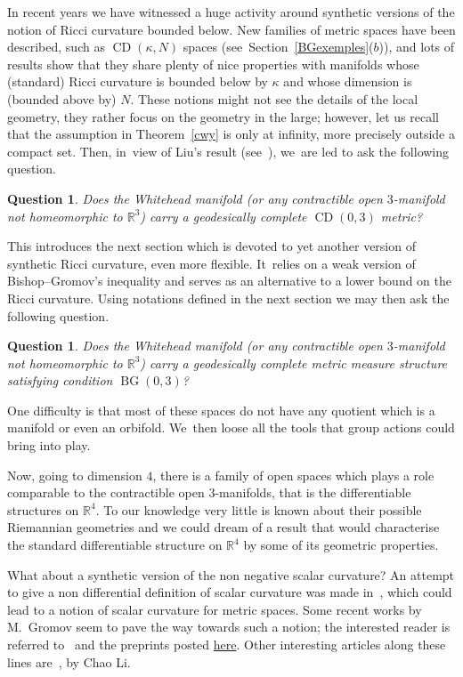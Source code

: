 \documentclass[pdftex]{sigma}
\numberwithin{equation}{section}
\newtheorem{question}[theor]{Question}
\newcommand{\CDCD}{\operatorname{CD}}
\newcommand{\BG}{\operatorname{BG}}
\begin{document}
In recent years we have witnessed a huge activity around synthetic versions of the notion of Ricci curvature bounded below. New families of metric
spaces have been described, such as $\CDCD (\kappa, N)$ spaces (see~Section~\ref{BGexemples}($b$)), and lots of results show that they share plenty of
nice properties with manifolds whose (standard) Ricci curvature is bounded below by $\kappa$ and whose dimension is (bounded above by) $N$. These notions might not see the details of the local geometry, they rather focus on the geometry in the large; however, let us recall that the assumption in Theorem~\ref{cwy} is only at infinity, more precisely outside a compact set. Then, in~view of Liu's result (see~\cite{Liu}), we~are led to ask the following question.

\begin{question}
Does the Whitehead manifold (or any contractible open $3$-manifold not homeo\-morphic to $\mathbb R^3$) carry a geodesically complete $\CDCD (0, 3)$ metric?
\end{question}

This introduces the next section which is devoted to yet another version of synthetic Ricci curvature, even more flexible. It~relies on a weak version of Bishop--Gromov's inequality and serves as an alternative to a lower bound on the Ricci curvature. Using notations defined in the next section we may then ask the following question.

\begin{question}
Does the Whitehead manifold (or any contractible open $3$-manifold not homeo\-morphic to $\mathbb R^3$) carry a geodesically complete metric measure
structure satisfying condition $\BG (0, 3)$?
\end{question}

One difficulty is that most of these spaces do not have any quotient which is a manifold or even an orbifold. We~then loose all the tools that group actions could bring into play.

Now, going to dimension $4$, there is a family of open spaces which plays
a role comparable to the contractible open $3$-manifolds, that is the differentiable structures on $\mathbb R^4$. To our knowledge very little is known about their possible Riemannian geometries and we could dream of a result that would characterise the standard differentiable structure on $\mathbb R^4$ by some of its geometric properties.

What about a synthetic version of the non negative scalar curvature? An attempt to give a non differential definition of scalar curvature was made in~\cite{Vero}, which could lead to a notion of scalar curvature for metric spaces. Some recent works by M.~Gromov seem to pave the way towards such a notion; the interested reader is referred to~\cite{Misha2, Misha1}
and the preprints posted \href{https://www.ihes.fr/~gromov/category/positivescalarcurvature/}{here}. Other interesting articles along these lines are~\cite{ChaoLi2, ChaoLi1}, by Chao Li.
\end{document}
